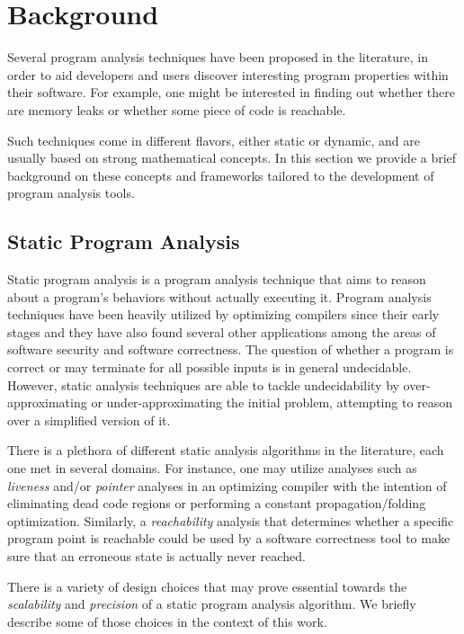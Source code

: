 \chapter{Background}\label{c:background}

Several program analysis techniques have been proposed in the literature, in
order to aid developers and users discover interesting program properties within
their software. For example, one might be interested in finding out whether
there are memory leaks or whether some piece of code is reachable.

Such techniques come in different flavors, either static or dynamic, and are
usually based on strong mathematical concepts. In this section we provide
a brief background on these concepts and frameworks tailored to
the development of program analysis tools.

\section{Static Program Analysis}

Static program analysis is a program analysis technique that aims to reason
about a program's behaviors without actually executing it. Program analysis techniques have been
heavily utilized by optimizing compilers since their early stages and they
have also found several other applications among the areas of software security
and software correctness\cite{spa}. The question of whether
a program is correct or may terminate for all possible inputs is in general
undecidable. However, static analysis techniques are able to tackle
undecidability by over-approximating or under-approximating the initial problem,
attempting to reason over a simplified version of it.

There is a plethora of different static analysis algorithms in the literature, each one
met in several domains. For instance, one may utilize analyses such as \emph{liveness} and/or
\emph{pointer} analyses in an optimizing compiler with the intention of eliminating
dead code regions or performing a constant propagation/folding optimization.
Similarly, a \emph{reachability} analysis that determines whether a specific program point is
reachable could be used by a software correctness tool to make sure that
an erroneous state is actually never reached.

There is a variety of design choices that may prove essential towards the \emph{scalability}
and \emph{precision} of a static program analysis algorithm. We briefly describe some of
those choices in the context of this work.

